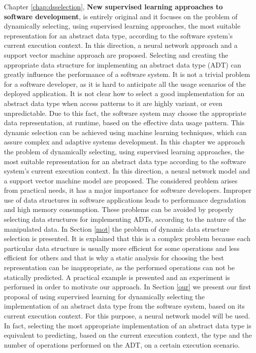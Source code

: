 Chapter \ref{chap:dsselection}, \textbf{New supervised learning approaches to software development}, is entirely original and it focuses on the problem of dynamically selecting, using supervised learning approaches, the most suitable representation for an abstract data type, according to the software system's current execution context. In this direction, a neural network approach and a support vector machine approach are proposed. 
Selecting and creating the appropriate data structure for implementing an abstract data type (ADT) can greatly influence the performance of a software system. It is not a trivial problem for a software developer, as it is hard to anticipate all the usage scenarios of the deployed application. It is not clear how to select a good implementation
for an abstract data type when access patterns to it are
highly variant, or even unpredictable. Due to this fact, the software system may choose the appropriate data representation, at runtime, based on the effective data usage pattern. This dynamic selection can be achieved using machine learning techniques, which can assure complex and adaptive systems development.
In this chapter we approach the problem of dynamically selecting, using supervised learning approaches, the most suitable representation for an abstract data type according to the software system's current execution context. In this direction, a neural network model and a support vector machine model are proposed. The considered problem arises from practical needs, it has a major importance for software developers. Improper use of data structures in software applications leads to performance degradation and high memory consumption. These problems can be avoided by properly selecting data structures for implementing ADTs, according to the nature of the manipulated data.
In Section \ref{mot} the problem of dynamic data structure selection is presented. It is explained that this is a complex problem because each particular data structure is usually more efficient for some operations and less efficient for others and that is why a static analysis for choosing the best representation can be inappropriate, as the performed operations can not be statically predicted. A practical example is presented and an experiment is performed in order to motivate our approach. 
In Section \ref{our} we present our first proposal of using supervised learning for dynamically selecting the implementation of an abstract data type from the software system, based on its current execution context. For this purpose, a neural network model will be used. In fact, selecting the most appropriate implementation of an abstract data type is equivalent to predicting, based on the current execution context, the type and the number of operations performed on the ADT, on a certain execution scenario.
